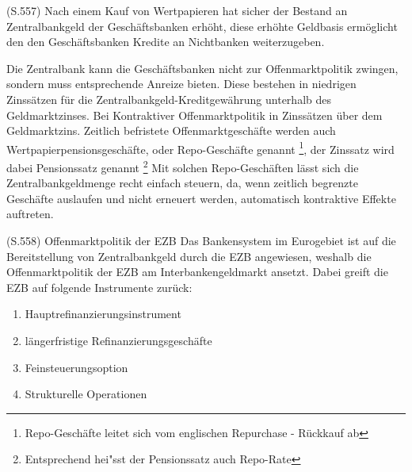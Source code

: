 \documentclass[
    onecolumn,
    a4paper,
    abstracton,
    parskip=half
    ,final
    ]{scrartcl}
\begin{document}
(S.557)
Nach einem Kauf von Wertpapieren hat sicher der Bestand an Zentralbankgeld der Gesch{\"a}ftsbanken erh{\"o}ht, diese erh{\"o}hte Geldbasis erm{\"o}glicht den den Gesch{\"a}ftsbanken Kredite an Nichtbanken weiterzugeben.

Die Zentralbank kann die Gesch{\"a}ftsbanken nicht zur Offenmarktpolitik zwingen, sondern muss entsprechende Anreize bieten. Diese bestehen in niedrigen Zinss{\"a}tzen f{\"u}r die Zentralbankgeld-Kreditgew{\"a}hrung unterhalb des Geldmarktzinses. Bei Kontraktiver Offenmarktpolitik in Zinss{\"a}tzen {\"u}ber dem Geldmarktzins.
Zeitlich befristete Offenmarktgesch{\"a}fte werden auch Wertpapierpensionsgesch{\"a}fte, oder Repo-Gesch{\"a}fte genannt \footnote[36]{Repo-Gesch{\"a}fte leitet sich vom englischen Repurchase - R{\"u}ckkauf ab}, der Zinssatz wird dabei Pensionssatz genannt \footnote[37]{Entsprechend hei{"ss}t der Pensionssatz auch Repo-Rate}
Mit solchen Repo-Gesch{\"a}ften l{\"a}sst sich die Zentralbankgeldmenge recht einfach steuern, da, wenn zeitlich begrenzte Gesch{\"a}fte auslaufen und nicht erneuert werden, automatisch kontraktive Effekte auftreten.


(S.558)
Offenmarktpolitik der EZB
Das Bankensystem im Eurogebiet ist auf die Bereitstellung von Zentralbankgeld durch die EZB angewiesen, weshalb die Offenmarktpolitik der EZB am Interbankengeldmarkt ansetzt. Dabei greift die EZB auf folgende Instrumente zur{\"u}ck:
\begin{enumerate}
  \item{Hauptrefinanzierungsinstrument}  
  \item{l{\"a}ngerfristige Refinanzierungsgesch{\"a}fte}  
  \item{Feinsteuerungsoption} 
  \item{Strukturelle Operationen}
  \end{enumerate}
\end{document}
